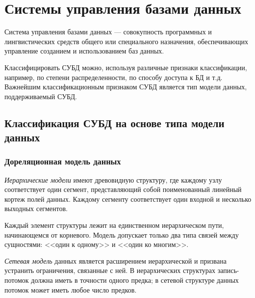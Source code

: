 \section{Системы управления базами данных}

Система управления базами данных --- совокупность программных и лингвистических средств общего или специального назначения, обеспечивающих управление созданием и использованием баз данных\cite{sbd}.

%

Классифицировать СУБД можно, используя различные признаки классификации, например, по степени распределенности, по способу доступа к БД и т.д. Важнейшим классификационным признаком СУБД является тип модели данных, поддерживаемый СУБД.

\subsection*{Классификация СУБД на основе типа модели данных}

\subsubsection*{Дореляционная модель данных}

\textit{Иерархические модели} имеют древовидную структуру, где каждому узлу соответствует один сегмент, представляющий собой поименованный линейный кортеж полей данных. Каждому сегменту соответствует один входной и несколько выходных сегментов. 

Каждый элемент структуры лежит на единственном иерархическом пути, начинающемся от корневого. Модель допускает только два типа связей между сущностями: <<один к одному>> и <<один ко многим>>.

\textit{Сетевая модель} данных является расширением иерархической и призвана устранить ограничения, связанные с ней. В иерархических структурах запись-потомок должна иметь в точности одного предка; в сетевой структуре данных потомок может иметь любое число предков.

